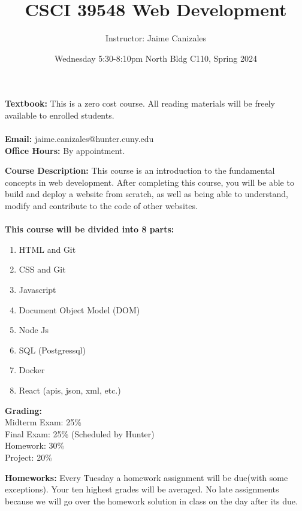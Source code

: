 \documentclass[a4paper]{article}
\title{CSCI 39548 Web Development}
\author{Instructor: Jaime Canizales}
\date{Wednesday 5:30-8:10pm North Bldg C110, Spring 2024}
\begin{document}
\maketitle

\textbf{Textbook:} This is a zero cost course. All reading materials will be freely available to enrolled students.
\\ \\
\textbf{Email:} jaime.canizales@hunter.cuny.edu \\
\textbf{Office Hours:} By appointment.

\textbf{Course Description:} This course is an introduction to the fundamental concepts in web development. After completing this course, you will be able to build and deploy a website from scratch, as well as being able to understand, modify and contribute to the code of other websites. \\\\ \textbf{This course will be divided into 8 parts:} 
\begin{enumerate}
    \item HTML and Git
    \item CSS and Git
    \item Javascript
    \item Document Object Model (DOM)
    \item Node Js
    \item SQL (Postgressql)
    \item Docker
    \item React (apis, json, xml, etc.)
\end{enumerate} 

\textbf{Grading: } \\
Midterm Exam: \hspace{1mm} 25\% \\
Final Exam: \hspace{6mm} 25\% (Scheduled by Hunter)\\
Homework: \hspace{8mm} 30\% \\
Project: \hspace{13mm} 20\%

\textbf{Homeworks: } Every Tuesday a homework assignment will be due(with some exceptions). Your ten highest grades will be averaged. No late assignments because we will go over the homework solution in class on the day after its due. 
\end{document}
